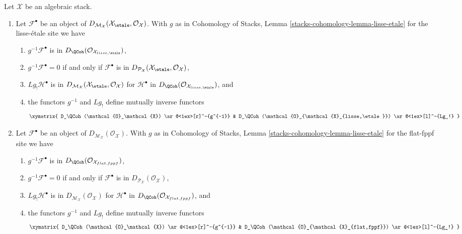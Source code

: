 \begin{lemma}
\label{lemma-derived-quasi-coherent}
Let $\mathcal{X}$ be an algebraic stack.
\begin{enumerate}
\item
Let $\mathcal{F}^\bullet$ be an object of
$D_{\mathcal{M}_\mathcal{X}}(\mathcal{X}_\etale, \mathcal{O}_\mathcal{X})$.
With $g$ as in
Cohomology of Stacks,
Lemma \ref{stacks-cohomology-lemma-lisse-etale}
for the lisse-\'etale site we have
\begin{enumerate}
\item $g^{-1}\mathcal{F}^\bullet$ is in
$D_\QCoh(\mathcal{O}_{\mathcal{X}_{lisse,\etale}})$,
\item $g^{-1}\mathcal{F}^\bullet = 0$ if and only if
$\mathcal{F}^\bullet$ is in
$D_{\mathcal{P}_\mathcal{X}}(\mathcal{X}_\etale, \mathcal{O}_\mathcal{X})$,
\item $Lg_!\mathcal{H}^\bullet$ is in
$D_{\mathcal{M}_\mathcal{X}}(
\mathcal{X}_\etale, \mathcal{O}_\mathcal{X})$
for $\mathcal{H}^\bullet$ in
$D_\QCoh(\mathcal{O}_{\mathcal{X}_{lisse,\etale}})$, and
\item the functors $g^{-1}$ and $Lg_!$ define mutually inverse functors
$$
\xymatrix{
D_\QCoh(\mathcal{O}_\mathcal{X}) \ar@<1ex>[r]^-{g^{-1}} &
D_\QCoh(\mathcal{O}_{\mathcal{X}_{lisse,\etale}})
\ar@<1ex>[l]^-{Lg_!}
}
$$
\end{enumerate}
\item
Let $\mathcal{F}^\bullet$ be an object of
$D_{\mathcal{M}_\mathcal{X}}(\mathcal{O}_\mathcal{X})$. With $g$ as in
Cohomology of Stacks,
Lemma \ref{stacks-cohomology-lemma-lisse-etale}
for the flat-fppf site we have
\begin{enumerate}
\item $g^{-1}\mathcal{F}^\bullet$ is in
$D_\QCoh(\mathcal{O}_{\mathcal{X}_{flat, fppf}})$,
\item $g^{-1}\mathcal{F}^\bullet = 0$ if and only if
$\mathcal{F}^\bullet$ is in
$D_{\mathcal{P}_\mathcal{X}}(\mathcal{O}_\mathcal{X})$,
\item $Lg_!\mathcal{H}^\bullet$ is in
$D_{\mathcal{M}_\mathcal{X}}(\mathcal{O}_\mathcal{X})$
for $\mathcal{H}^\bullet$ in
$D_\QCoh(\mathcal{O}_{\mathcal{X}_{flat,fppf}})$, and
\item the functors $g^{-1}$ and $Lg_!$ define mutually inverse functors
$$
\xymatrix{
D_\QCoh(\mathcal{O}_\mathcal{X}) \ar@<1ex>[r]^-{g^{-1}} &
D_\QCoh(\mathcal{O}_{\mathcal{X}_{flat,fppf}}) \ar@<1ex>[l]^-{Lg_!}
}
$$
\end{enumerate}
\end{enumerate}
\end{lemma}

